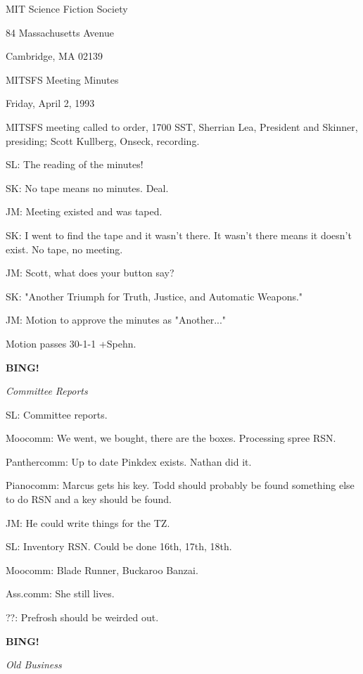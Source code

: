 \documentclass[12pt]{article}
\newcommand{\bing}{{\bf BING!} }
\newcommand{\goto}[1]{\bing \vskip 12pt \centerline{{\em{#1}}}}
\begin{document}
\begin{center}

MIT Science Fiction Society 

84 Massachusetts Avenue

Cambridge, MA 02139

\vspace{12pt}

MITSFS Meeting Minutes 

Friday, April 2, 1993

\end{center}
 
\vspace{18pt}

\setlength{\parskip}{6pt}

\noindent
MITSFS meeting called to order, 1700 SST,
Sherrian Lea, President and Skinner, presiding; Scott Kullberg, Onseck, recording.

SL: The reading of the minutes!

SK: No tape means no minutes. Deal.

JM: Meeting existed and was taped.

SK: I went to find the tape and it wasn't there. It wasn't there means it doesn't exist. No tape, no meeting.

JM: Scott, what does your button say?

SK: "Another Triumph for Truth, Justice, and Automatic Weapons."

JM: Motion to approve the minutes as "Another..."

Motion passes 30-1-1 +Spehn.

\goto{Committee Reports}

SL: Committee reports.

Moocomm: We went, we bought, there are the boxes. Processing spree RSN.

Panthercomm: Up to date Pinkdex exists. Nathan did it.

Pianocomm: Marcus gets his key. Todd should probably be found something else to do RSN and a key should be found.

JM: He could write things for the TZ.

SL: Inventory RSN. Could be done 16th, 17th, 18th.

Moocomm: Blade Runner, Buckaroo Banzai.

Ass.comm: She still lives.

??: Prefrosh should be weirded out.

\goto{Old Business}
\end{document}
